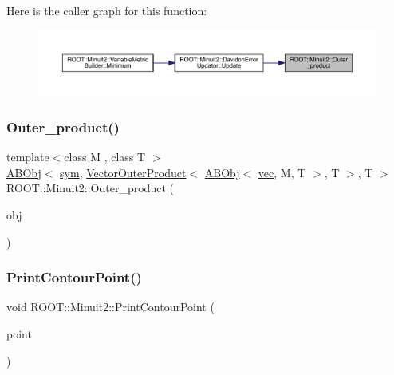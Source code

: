Here is the caller graph for this function\+:\nopagebreak
\begin{figure}[H]
\begin{center}
\leavevmode
\includegraphics[width=350pt]{d6/d3a/namespaceROOT_1_1Minuit2_a2f3a76ab9b1a9a2ed58cfdc8de6ff704_icgraph}
\end{center}
\end{figure}
\mbox{\label{namespaceROOT_1_1Minuit2_af2403945113672e7581188addb96ff15}} 
\subsubsection{\texorpdfstring{Outer\_product()}{Outer\_product()}\hspace{0.1cm}{\footnotesize\ttfamily [2/2]}}
{\footnotesize\ttfamily template$<$class M , class T $>$ \\
\mbox{\hyperlink{classROOT_1_1Minuit2_1_1ABObj}{A\+B\+Obj}}$<$ \mbox{\hyperlink{classROOT_1_1Minuit2_1_1sym}{sym}}, \mbox{\hyperlink{classROOT_1_1Minuit2_1_1VectorOuterProduct}{Vector\+Outer\+Product}}$<$ \mbox{\hyperlink{classROOT_1_1Minuit2_1_1ABObj}{A\+B\+Obj}}$<$ \mbox{\hyperlink{classROOT_1_1Minuit2_1_1vec}{vec}}, M, T $>$, T $>$, T $>$ R\+O\+O\+T\+::\+Minuit2\+::\+Outer\+\_\+product (\begin{DoxyParamCaption}\item[{const \mbox{\hyperlink{classROOT_1_1Minuit2_1_1ABObj}{A\+B\+Obj}}$<$ \mbox{\hyperlink{classROOT_1_1Minuit2_1_1vec}{vec}}, M, T $>$ \&}]{obj }\end{DoxyParamCaption})\hspace{0.3cm}{\ttfamily [inline]}}

\mbox{\label{namespaceROOT_1_1Minuit2_a4075583a4cbc4a719ed2ec32e1d76bbf}} 
\subsubsection{\texorpdfstring{PrintContourPoint()}{PrintContourPoint()}}
{\footnotesize\ttfamily void R\+O\+O\+T\+::\+Minuit2\+::\+Print\+Contour\+Point (\begin{DoxyParamCaption}\item[{const std\+::pair$<$ double, double $>$ \&}]{point }\end{DoxyParamCaption})}


